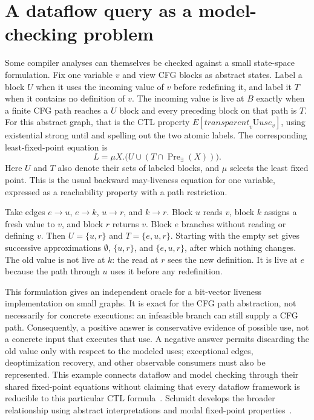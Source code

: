 \section{A dataflow query as a model-checking problem}
\label{sec:ch47-dataflow-query}

Some compiler analyses can themselves be checked against a small state-space formulation.
Fix one variable $v$ and view CFG blocks as abstract states.
Label a block $U$ when it uses the incoming value of $v$ before redefining it, and label it $T$ when it contains no definition of $v$.
The incoming value is live at $B$ exactly when a finite CFG path reaches a $U$ block and every preceding block on that path is $T$.
For this abstract graph, that is the CTL property $E[\mathit{transparent}_v\mathbin{\mathrm{U}}\mathit{use}_v]$, using existential strong until and spelling out the two atomic labels.
The corresponding least-fixed-point equation is
\[
  L=\mu X.\bigl(U\cup(T\cap\operatorname{Pre}_{\exists}(X))\bigr).
\]
Here $U$ and $T$ also denote their sets of labeled blocks, and $\mu$ selects the least fixed point.
This is the usual backward may-liveness equation for one variable, expressed as a reachability property with a path restriction.

Take edges $e\to u$, $e\to k$, $u\to r$, and $k\to r$.
Block $u$ reads $v$, block $k$ assigns a fresh value to $v$, and block $r$ returns $v$.
Block $e$ branches without reading or defining $v$.
Then $U=\{u,r\}$ and $T=\{e,u,r\}$.
Starting with the empty set gives successive approximations $\emptyset$, $\{u,r\}$, and $\{e,u,r\}$, after which nothing changes.
The old value is not live at $k$: the read at $r$ sees the new definition.
It is live at $e$ because the path through $u$ uses it before any redefinition.

This formulation gives an independent oracle for a bit-vector liveness implementation on small graphs.
It is exact for the CFG path abstraction, not necessarily for concrete executions: an infeasible branch can still supply a CFG path.
Consequently, a positive answer is conservative evidence of possible use, not a concrete input that executes that use.
A negative answer permits discarding the old value only with respect to the modeled uses; exceptional edges, deoptimization recovery, and other observable consumers must also be represented.
This example connects dataflow and model checking through their shared fixed-point equations without claiming that every dataflow framework is reducible to this particular CTL formula~\cite{nielson-1999-principles,baier-2008-model-checking}.
Schmidt develops the broader relationship using abstract interpretations and modal fixed-point properties~\cite{schmidt-1998-dataflow-model-checking}.

